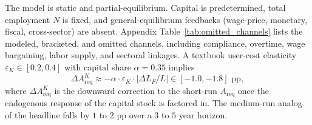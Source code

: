 The model is static and partial-equilibrium. Capital is predetermined, total employment $N$ is fixed, and general-equilibrium feedbacks (wage-price, monetary, fiscal, cross-sector) are absent. Appendix Table~\ref{tab:omitted_channels} lists the modeled, bracketed, and omitted channels, including compliance, overtime, wage bargaining, labor supply, and sectoral linkages. A textbook user-cost elasticity $\varepsilon_K\in[0.2,0.4]$ \citep{Caballero1999} with capital share $\alpha=0.35$ implies
\begin{equation}\label{eq:pe_bound}
    \Delta A_{\text{req}}^{K}\approx -\alpha\cdot\varepsilon_K\cdot|\Delta L_F/L|\in[-1.0,-1.8]\text{ pp},
\end{equation}
where $\Delta A_{\text{req}}^{K}$ is the downward correction to the short-run $A_{\text{req}}$ once the endogenous response of the capital stock is factored in. The medium-run analog of the headline falls by $1$ to $2$ pp over a $3$ to $5$ year horizon.

